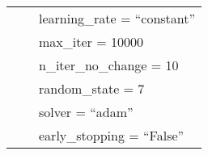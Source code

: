 \begin{tabular}{lll}
                                        &                           & learning\_rate = “constant”   \\
                                        &                           & max\_iter = 10000         \\
                                        &                           & n\_iter\_no\_change = 10  \\
                                        &                           & random\_state = 7         \\
                                        &                           & solver = “adam”           \\
                                        &                           & early\_stopping = “False” \\
    \bottomrule
\end{tabular}


